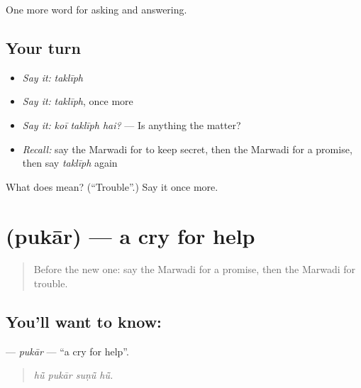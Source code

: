 \begin{grammarlens}[title={What you've built}]
One more word for asking and answering.
\end{grammarlens}

\subsection*{Your turn}
\begin{itemize}
\raggedright
  \item \emph{Say it:} \emph{taklīph}
  \item \emph{Say it:} \emph{taklīph}, once more
  \item \emph{Say it:} \emph{koī taklīph hai?} — Is anything the matter?
  \item \emph{Recall:} say the Marwadi for to keep secret, then the Marwadi for a promise, then say \emph{taklīph} again
\end{itemize}

\begin{tcolorbox}[breakable,colback=teal!4,colframe=teal!35!black,title={Before you move on}]
What does  mean? (\textquotedblleft{}Trouble\textquotedblright{}.) Say it once more.
\end{tcolorbox}
\section[\texorpdfstring{\mw{पुकार} (pukār)}{पुकार (pukār)}]{ (pukār) — a cry for help}

\label{lesson:MW-C274-pukar}



\begin{quote}
Before the new one: say the Marwadi for a promise, then the Marwadi for trouble.
\end{quote}

\subsection*{You'll want to know: }
\textbf{} — \emph{pukār} — \textquotedblleft{}a cry for help\textquotedblright{}.

\begin{quote}
   
\end{quote}

\begin{quote}
\emph{hū̃ pukār suṇū̃ hū̃.}
\end{quote}

